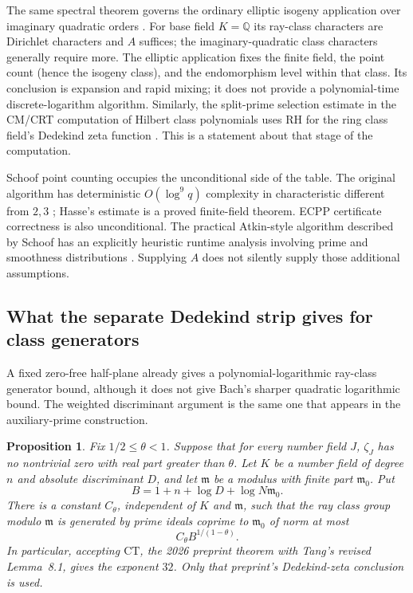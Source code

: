 \documentclass[11pt]{article}
\newcommand{\Q}{\mathbb Q}
\newtheorem{proposition}[theorem]{Proposition}
\theoremstyle{definition}
\theoremstyle{remark}
\begin{document}
The same spectral theorem governs the ordinary elliptic isogeny
application over imaginary quadratic orders
\citep[Theorems~1.1, 1.5--1.6]{JMV2009}. For base field $K=\Q$ its
ray-class characters are Dirichlet characters and $A$ suffices; the
imaginary-quadratic class characters generally require more.
The elliptic application fixes the finite field, the point count
(hence the isogeny class), and the endomorphism level within that class.
Its conclusion is expansion and rapid mixing; it does not provide a
polynomial-time discrete-logarithm algorithm.
Similarly, the split-prime selection estimate in the CM/CRT computation
of Hilbert class polynomials uses RH for the ring class field's
Dedekind zeta function
\citep[equation (21) and Lemma~2, corrected author pp.~21--22]{Sutherland2011}.
This is a statement about that stage of the computation.

Schoof point counting occupies the unconditional side of the table.
The original algorithm has deterministic $O(\log^9q)$ complexity in
characteristic different from $2,3$
\citep[pp.~483, 485--490]{Schoof1985}; Hasse's estimate is a proved
finite-field theorem. ECPP certificate correctness is also unconditional.
The practical Atkin-style algorithm described by Schoof has an explicitly
heuristic runtime analysis involving prime and smoothness distributions
\citep[Theorem~5.2, p.~121; pp.~122, 124--125]{Schoof2008}.
Supplying $A$ does not silently supply those additional assumptions.

\subsection{What the separate Dedekind strip gives for class generators}
A fixed zero-free half-plane already gives a polynomial-logarithmic
ray-class generator bound, although it does not give Bach's sharper
quadratic logarithmic bound.  The weighted discriminant argument is
the same one that appears in the auxiliary-prime construction.

\begin{proposition}\label{prop:ray-class-strip}
Fix $1/2\le\theta<1$.  Suppose that for every number field $J$,
$\zeta_J$ has no nontrivial zero with real part greater than $\theta$.
Let $K$ be a number field of degree $n$ and absolute discriminant $D$,
and let $\mathfrak m$ be a modulus with finite part
$\mathfrak m_0$.  Put
\[
 B=1+n+\log D+\log N\mathfrak m_0.
\]
There is a constant $C_\theta$, independent of $K$ and
$\mathfrak m$, such that the ray class group modulo $\mathfrak m$
is generated by prime ideals coprime to $\mathfrak m_0$ of norm at most
\[
 C_\theta B^{1/(1-\theta)}.
\]
In particular, accepting \(\mathrm{CT}\), the 2026 preprint theorem
with Tang's revised Lemma~8.1, gives the exponent \(32\).
Only that preprint's Dedekind-zeta conclusion is used.
\end{proposition}
\end{document}
